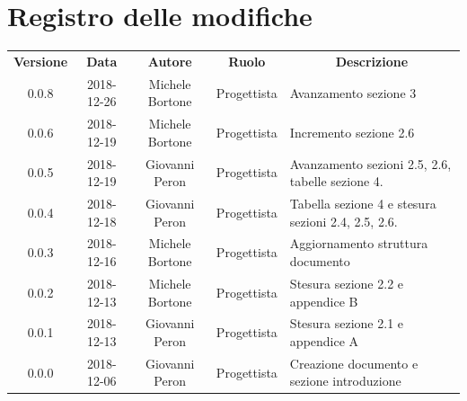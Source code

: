 \documentclass[11pt,a4paper]{article}
\begin{document}
	
	\newpage
	\section*{\centering Registro delle modifiche}
	\begin{tabularx}{\textwidth}{ c | c | c | c | X }
		\rowcolor{LightBlue}
		\color{white}\bfseries Versione & \color{white}\bfseries Data & \color{white}\bfseries Autore & \color{white}\bfseries Ruolo & \multicolumn{1}{c}{\color{white}\bfseries Descrizione}\\[0.25cm]
		0.0.8 & 2018-12-26 & Michele Bortone & Progettista & Avanzamento sezione 3\\ \hline
		0.0.6 & 2018-12-19 & Michele Bortone & Progettista & Incremento sezione 2.6\\ \hline
		0.0.5 & 2018-12-19 & Giovanni Peron & Progettista & Avanzamento sezioni 2.5, 2.6, tabelle sezione 4.\\ \hline
		0.0.4 & 2018-12-18 & Giovanni Peron & Progettista & Tabella sezione 4 e stesura sezioni 2.4, 2.5, 2.6.\\ \hline
		0.0.3 & 2018-12-16 & Michele Bortone & Progettista & Aggiornamento struttura documento\\ \hline
		0.0.2 & 2018-12-13 & Michele Bortone & Progettista & Stesura sezione 2.2  e appendice B\\ \hline
		0.0.1 & 2018-12-13 & Giovanni Peron & Progettista & Stesura sezione 2.1 e appendice A \\ \hline
		0.0.0 & 2018-12-06 & Giovanni Peron & Progettista & Creazione documento e
sezione introduzione \\ \hline
	\end{tabularx}
	\newpage
	\tableofcontents
	\newpage
		
	\newpage
	
	\newpage
	
	\newpage
	
	\newpage
		
\end{document}
